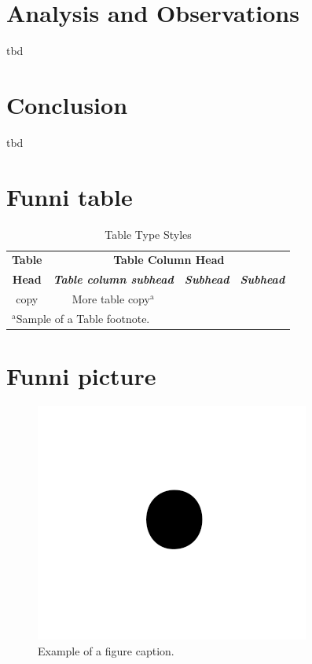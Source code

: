 \documentclass[conference]{IEEEtran}
\begin{document}
\section{Analysis and Observations}
tbd

\section{Conclusion}
tbd




\section{Funni table}

\begin{table}[htbp]
\caption{Table Type Styles}
\begin{center}
\begin{tabular}{|c|c|c|c|}
\hline
\textbf{Table}&\multicolumn{3}{|c|}{\textbf{Table Column Head}} \\
\cline{2-4} 
\textbf{Head} & \textbf{\textit{Table column subhead}}& \textbf{\textit{Subhead}}& \textbf{\textit{Subhead}} \\
\hline
copy& More table copy$^{\mathrm{a}}$& &  \\
\hline
\multicolumn{4}{l}{$^{\mathrm{a}}$Sample of a Table footnote.}
\end{tabular}
\label{tab1}
\end{center}
\end{table}

\section{Funni picture}

\begin{figure}[htbp]
\centerline{\includegraphics{fig1.png}}
\caption{Example of a figure caption.}
\label{fig}
\end{figure}
\end{document}
